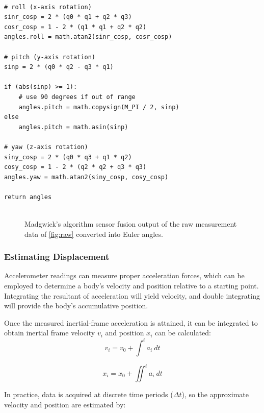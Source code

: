 \lstset{language=Python}
\begin{lstlisting}[frame=single]  % Start your code-block
    
# roll (x-axis rotation)
sinr_cosp = 2 * (q0 * q1 + q2 * q3)
cosr_cosp = 1 - 2 * (q1 * q1 + q2 * q2)
angles.roll = math.atan2(sinr_cosp, cosr_cosp)

# pitch (y-axis rotation)
sinp = 2 * (q0 * q2 - q3 * q1)

if (abs(sinp) >= 1):
    # use 90 degrees if out of range
    angles.pitch = math.copysign(M_PI / 2, sinp)
else
    angles.pitch = math.asin(sinp)

# yaw (z-axis rotation)
siny_cosp = 2 * (q0 * q3 + q1 * q2)
cosy_cosp = 1 - 2 * (q2 * q2 + q3 * q3)
angles.yaw = math.atan2(siny_cosp, cosy_cosp)

return angles
    
\end{lstlisting}

\begin{figure}
    \centering
    \resizebox{0.8\linewidth}{!}{}
    \caption{Madgwick's algorithm sensor fusion output of the raw measurement data of  \ref{fig:raw} converted into Euler angles.}
    \label{fig:fusion_output_euler}
\end{figure}


\newpage

\subsubsection{Estimating Displacement}

Accelerometer readings can measure proper acceleration forces, which can be employed to determine a body's velocity and position relative to a starting point. Integrating the resultant of acceleration will yield velocity, and double integrating will provide the body's accumulative position.

Once the measured inertial-frame acceleration is attained, it can be integrated to obtain inertial frame velocity $v_i$  and position $x_i$ can be calculated:
\begin{equation}
    v_i = v_0 +  \int^t a_i~dt
\end{equation}

\begin{equation}
    x_i = x_0 + \iint^t a_i~dt
\end{equation}

In practice, data is acquired at discrete time periods ($\Delta t$), so the approximate velocity and position are estimated by:

